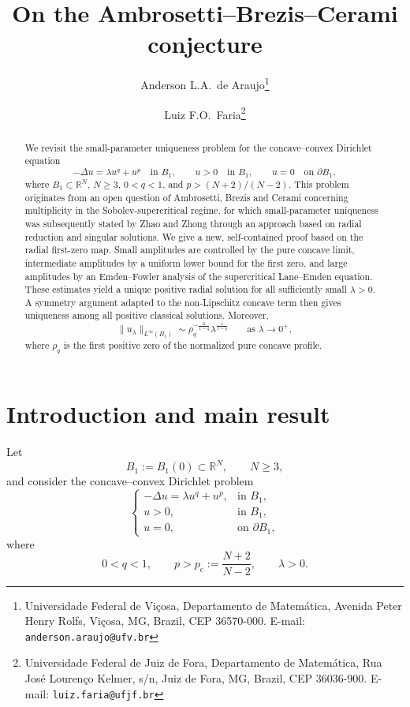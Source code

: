 \documentclass[11pt]{article}
\title{On the Ambrosetti--Brezis--Cerami conjecture}
\author{
Anderson L.A.~de Araujo\thanks{
Universidade Federal de Vi\c{c}osa,
Departamento de Matem\'atica,
Avenida Peter Henry Rolfs,
Vi\c{c}osa, MG, Brazil, CEP 36570-000.
E-mail: \texttt{anderson.araujo@ufv.br}}
\and
Luiz F.O.~Faria\thanks{
Universidade Federal de Juiz de Fora,
Departamento de Matem\'atica,
Rua Jos\'e Louren\c{c}o Kelmer, s/n,
Juiz de Fora, MG, Brazil, CEP 36036-900.
E-mail: \texttt{luiz.faria@ufjf.br}}
}
\date{}
\newcommand{\pc}{p_{\mathrm c}}
\theoremstyle{definition}
\begin{document}
\maketitle

\begin{abstract}
We revisit the small-parameter uniqueness problem for the
concave--convex Dirichlet equation
\[
-\Delta u=\lambda u^q+u^p \quad\text{in }B_1,
\qquad u>0 \quad\text{in }B_1,
\qquad u=0 \quad\text{on }\partial B_1,
\]
where $B_1\subset\mathbb{R}^N$, $N\geq3$, $0<q<1$, and
$p>(N+2)/(N-2)$. This problem originates from an open question of
Ambrosetti, Brezis and Cerami concerning multiplicity in the
Sobolev-supercritical regime, for which small-parameter uniqueness
was subsequently stated by Zhao and Zhong through an approach based
on radial reduction and singular solutions. We give a new,
self-contained proof based on the radial first-zero map. Small
amplitudes are controlled by the pure concave limit, intermediate
amplitudes by a uniform lower bound for the first zero, and large
amplitudes by an Emden--Fowler analysis of the supercritical
Lane--Emden equation. These estimates yield a unique positive radial
solution for all sufficiently small $\lambda>0$. A symmetry argument
adapted to the non-Lipschitz concave term then gives uniqueness among
all positive classical solutions. Moreover,
\[
\|u_\lambda\|_{L^\infty(B_1)}
\sim
\rho_q^{-\frac{2}{1-q}}\lambda^{\frac1{1-q}}
\qquad\text{as }\lambda\to0^+,
\]
where $\rho_q$ is the first positive zero of the normalized pure
concave profile.
\end{abstract}

\section{Introduction and main result}
Let
\[
B_1:=B_1(0)\subset\mathbb{R}^N,
\qquad N\geq3,
\]
and consider the concave--convex Dirichlet problem
\begin{equation}
\label{eq:ABC}
\begin{cases}
-\Delta u=\lambda u^q+u^p,
&\text{in }B_1,\\
u>0,
&\text{in }B_1,\\
u=0,
&\text{on }\partial B_1,
\end{cases}
\end{equation}
where
\begin{equation}
\label{eq:hyp}
0<q<1,
\qquad
p>\pc:=\frac{N+2}{N-2},
\qquad
\lambda>0.
\end{equation}
\end{document}
